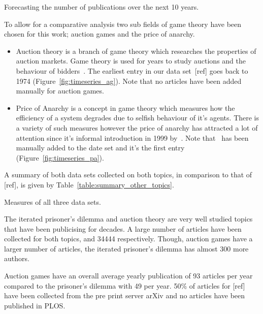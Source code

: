 \documentclass{article}
\theoremstyle{definition}
\newcommand{\totalarticles}{}
\begin{document}
\begin{table}[!hbtp]
    \begin{center}
    
    \end{center}
    \caption{Forecasting the number of publications over the next 10 years.}
    \label{table:forecast}
\end{table}

To allow for a comparative analysis two sub fields of game theory have been chosen
for this work; auction games and the price of anarchy.

\begin{itemize}
    \item Auction theory is a branch of game theory which researches the properties
    of auction markets.
    Game theory is used for years to study auctions and the behaviour of
    bidders~\cite{Shubik1971}. The earliest entry in our data set~[ref] goes
    back to 1974 (Figure~\ref{fig:timeseries_ag}). Note that no articles
    have been added manually for auction games.
    \item Price of Anarchy is a concept in game theory which
    measures how the efficiency of a system degrades due to selfish behaviour of
    it's agents. There is a variety of such measures however the price of anarchy
    has attracted a lot of attention since it's informal introduction in 1999
    by~\cite{Koutsoupias1999}. Note that~\cite{Koutsoupias1999} has been manually
    added to the date set and it's the first entry (Figure~\ref{fig:timeseries_pa}).
\end{itemize}

A summary of both data sets collected on both topics, in comparison to that of
[ref], is given by Table~\ref{table:summary_other_topics}.

\begin{table}[!hbtp]
    \centering
    \resizebox{\textwidth}{!}{
    }
    \caption{Measures of all three data sets.}\label{table:summary_other_topics}
\end{table}

The iterated prisoner's dilemma and auction theory are very well studied topics
that have been publicising for decades. A large number of articles have
been collected for both topics, \totalarticles and 34444 respectively. Though, auction
games have a larger number of articles, the iterated prisoner's dilemma
has almost 300 more authors.

Auction games have an overall average yearly publication
of 93 articles per year compared to the prisoner's dilemma with 49 per year. 50\% of articles
for [ref] have been collected from the pre print server arXiv and no articles have
been published in PLOS.
\end{document}
